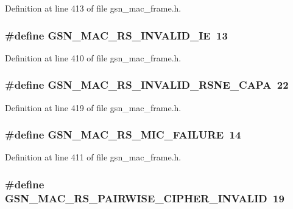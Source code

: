 Definition at line 413 of file gsn\_\-mac\_\-frame.h.

\hypertarget{a00523_a13d95fbfc69f83f6ad1ff6610b0d1ca8}{
\subsubsection[{GSN\_\-MAC\_\-RS\_\-INVALID\_\-IE}]{\setlength{\rightskip}{0pt plus 5cm}\#define GSN\_\-MAC\_\-RS\_\-INVALID\_\-IE~13}}
\label{a00523_a13d95fbfc69f83f6ad1ff6610b0d1ca8}


Definition at line 410 of file gsn\_\-mac\_\-frame.h.

\hypertarget{a00523_aa6e5afa704ef4b48b0c2dee82a1faf2f}{
\subsubsection[{GSN\_\-MAC\_\-RS\_\-INVALID\_\-RSNE\_\-CAPA}]{\setlength{\rightskip}{0pt plus 5cm}\#define GSN\_\-MAC\_\-RS\_\-INVALID\_\-RSNE\_\-CAPA~22}}
\label{a00523_aa6e5afa704ef4b48b0c2dee82a1faf2f}


Definition at line 419 of file gsn\_\-mac\_\-frame.h.

\hypertarget{a00523_a4018559db6af90ce22bafc7a2473fa7e}{
\subsubsection[{GSN\_\-MAC\_\-RS\_\-MIC\_\-FAILURE}]{\setlength{\rightskip}{0pt plus 5cm}\#define GSN\_\-MAC\_\-RS\_\-MIC\_\-FAILURE~14}}
\label{a00523_a4018559db6af90ce22bafc7a2473fa7e}


Definition at line 411 of file gsn\_\-mac\_\-frame.h.

\hypertarget{a00523_a17c95193c7503cee20a5b5689049348a}{
\subsubsection[{GSN\_\-MAC\_\-RS\_\-PAIRWISE\_\-CIPHER\_\-INVALID}]{\setlength{\rightskip}{0pt plus 5cm}\#define GSN\_\-MAC\_\-RS\_\-PAIRWISE\_\-CIPHER\_\-INVALID~19}}
\label{a00523_a17c95193c7503cee20a5b5689049348a}


